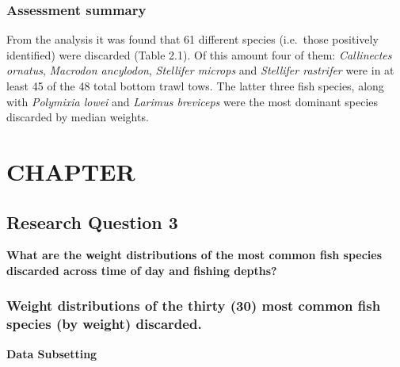 \documentclass[
]{book}
\newenvironment{Shaded}{\begin{snugshade}}{\end{snugshade}}
\newcommand{\CommentTok}[1]{\textcolor[rgb]{0.56,0.35,0.01}{\textit{#1}}}
\newcommand{\KeywordTok}[1]{\textcolor[rgb]{0.13,0.29,0.53}{\textbf{#1}}}
\newcommand{\NormalTok}[1]{#1}
\newcommand{\OperatorTok}[1]{\textcolor[rgb]{0.81,0.36,0.00}{\textbf{#1}}}
\newcommand{\StringTok}[1]{\textcolor[rgb]{0.31,0.60,0.02}{#1}}
\begin{document}
\hypertarget{assessment-summary-1}{%
\subsection{Assessment summary}\label{assessment-summary-1}}

From the analysis it was found that 61 different species (i.e.~those positively identified) were discarded (Table 2.1). Of this amount four of them: \emph{Callinectes ornatus}, \emph{Macrodon ancylodon}, \emph{Stellifer microps} and \emph{Stellifer rastrifer} were in at least 45 of the 48 total bottom trawl tows. The latter three fish species, along with \emph{Polymixia lowei} and \emph{Larimus breviceps} were the most dominant species discarded by median weights.

\hypertarget{chapter-2}{%
\chapter{CHAPTER}\label{chapter-2}}

\hypertarget{research-question-3}{%
\section{Research Question 3}\label{research-question-3}}

\textbf{What are the weight distributions of the most common fish species discarded across time of day and fishing depths?}

\hypertarget{weight-distributions-of-the-thirty-30-most-common-fish-species-by-weight-discarded.}{%
\subsection{Weight distributions of the thirty (30) most common fish species (by weight) discarded.}\label{weight-distributions-of-the-thirty-30-most-common-fish-species-by-weight-discarded.}}

\textbf{Data Subsetting}

\begin{Shaded}
\end{Shaded}
\end{document}
